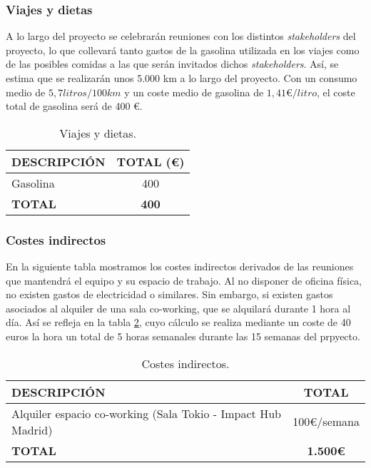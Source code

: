 \subsubsection{Viajes y dietas}
\par A lo largo del proyecto se celebrarán reuniones con los distintos \textit{stakeholders} del proyecto, lo que collevará tanto gastos de la gasolina utilizada en los viajes como de las posibles comidas a las que serán invitados dichos \textit{stakeholders}. Así, se estima que se realizarán unos 5.000 km a lo largo del proyecto. Con un consumo medio de $5,7 litros /100km$ y un coste medio de gasolina de $1,41 \euro/litro$, el coste total de gasolina será de 400 \euro.

\begin{table}[H]
\begin{center}
\begin{tabular}{l c}
\textbf{DESCRIPCIÓN} & \textbf{TOTAL (\euro)}\\ \hline \hline
Gasolina & 400\\
\textbf{TOTAL} & \textbf{400}\\ \hline
\end{tabular}
\caption{Viajes y dietas.}
\label{tab:viajes}
\end{center}
\end{table}


\subsubsection{Costes indirectos}
En la siguiente tabla mostramos los costes indirectos derivados de las reuniones que mantendrá el equipo y su espacio de trabajo. Al no disponer de oficina física, no existen gastos de electricidad o similares. Sin embargo, si existen gastos asociados al alquiler de una sala co-working, que se alquilará durante 1 hora al día. Así se refleja en la tabla \ref{tab:indirectos}, cuyo cálculo se realiza mediante un coste de 40 euros la hora un total de 5 horas semanales durante las 15 semanas del prpyecto.

\begin{table}[H]
\begin{center}
\begin{tabular}{l c}
\textbf{DESCRIPCIÓN} & \textbf{TOTAL}\\ \hline \hline
Alquiler espacio co-working (Sala Tokio - Impact Hub Madrid) & 100\euro/semana\\ \hline \hline
\textbf{TOTAL} & \textbf{1.500\euro}\\ \hline
\end{tabular}
\caption{Costes indirectos.}
\label{tab:indirectos}
\end{center}
\end{table}

